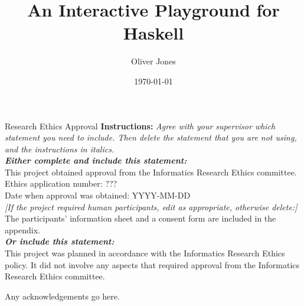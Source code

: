 \documentclass[main.tex]{subfiles}
\begin{document}
\begin{preliminary}

    \title{An Interactive Playground for Haskell}
    \author{Oliver Jones}
    \date{\today}


    \maketitle

    \newenvironment{ethics}{
        \begin{frontenv}{Research Ethics Approval}{\LARGE}} {
        \end{frontenv}
        \newpage}

    \begin{ethics}
        \textbf{Instructions:} \emph{Agree with your supervisor which
            statement you need to include.
            Then delete the statement that you are not using, and the instructions in
                italics.
            \\
            \textbf{Either complete and include this statement:}}\\ %
        This project obtained approval from the Informatics Research Ethics committee.
        \\
        Ethics application number: ???\\
        Date when approval was obtained: YYYY-MM-DD\\
        \emph{[If the project required human participants, edit as appropriate, otherwise delete:]}\\ %
        The participants' information sheet and a consent form are included in the
            appendix.
        \\
        \textbf{\emph{Or include this statement:}}\\ %
        This project was planned in accordance with the Informatics Research Ethics
            policy.
        It did not involve any aspects that required approval from the Informatics
            Research Ethics committee.

        \standarddeclaration
    \end{ethics}

    \begin{acknowledgements}
        Any acknowledgements go here.
    \end{acknowledgements}

    \tableofcontents
\end{preliminary}
\end{document}

